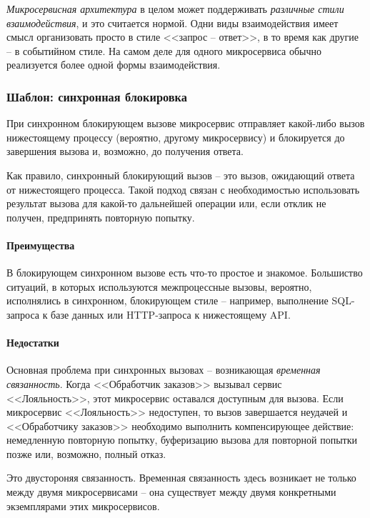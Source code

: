 \documentclass[%
	11pt,
	a4paper,
	utf8,
		]{article}
\begin{document}
\emph{Микросервисная архитектура} в целом может поддерживать \emph{различные стили взаимодействия}, и это считается нормой. Одни виды взаимодействия имеет смысл организовать просто в стиле <<запрос -- ответ>>, в то время как другие -- в событийном стиле. На самом деле для одного микросервиса обычно реализуется более одной формы взаимодействия.

\subsubsection{Шаблон: синхронная блокировка}

При синхронном блокирующем вызове микросервис отправляет какой-либо вызов нижестоящему процессу (вероятно, другому микросервису) и блокируется до завершения вызова и, возможно, до получения ответа.

Как правило, синхронный блокирующий вызов -- это вызов, ожидающий ответа от нижестоящего процесса. Такой подход связан с необходимостью использовать результат вызова для какой-то дальнейшей операции или, если отклик не получен, предпринять повторную попытку.

\paragraph{Преимущества} В блокирующем синхронном вызове есть что-то простое и знакомое. Большиство ситуаций, в которых используются межпроцессные вызовы, вероятно, исполнялись в синхронном, блокирующем стиле -- например, выполнение SQL-запроса к базе данных или HTTP-запроса к нижестоящему API.

\paragraph{Недостатки} 

Основная проблема при синхронных вызовах -- возникающая \emph{временная связанность}. Когда <<Обработчик заказов>> вызывал сервис <<Лояльность>>, этот микросервис оставался доступным для вызова. Если микросервис <<Лояльность>> недоступен, то вызов завершается неудачей и <<Обработчику заказов>> необходимо выполнить компенсирующее действие: немедленную повторную попытку, буферизацию вызова для повторной попытки позже или, возможно, полный отказ.

Это двустороняя связанность. Временная связанность здесь возникает не только между двумя микросервисами -- она существует между двумя конкретными экземплярами этих микросервисов. 
\end{document}
